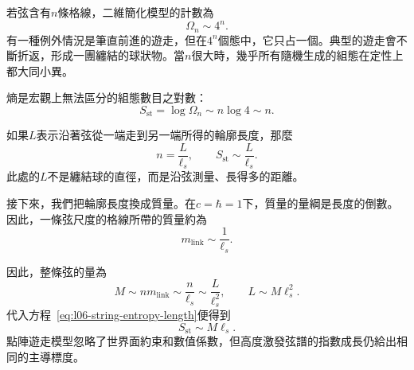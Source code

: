 若弦含有\(n\)條格線，二維簡化模型的計數為
\begin{equation}
\Omega_n\sim4^n.
\label{eq:l06-walk-count}
\end{equation}
有一種例外情況是筆直前進的遊走，但在\(4^n\)個態中，它只占一個。典型的遊走會不斷折返，形成一團纏結的球狀物。當\(n\)很大時，幾乎所有隨機生成的組態在定性上都大同小異。

熵是宏觀上無法區分的組態數目之對數：
\begin{equation}
S_{\mathrm{st}}=\log\Omega_n\sim n\log4\sim n.
\label{eq:l06-string-entropy-n}
\end{equation}

\begin{classroomqa}
\end{classroomqa}

如果\(L\)表示沿著弦從一端走到另一端所得的輪廓長度，那麼
\begin{equation}
n=\frac{L}{\ell_s},
\qquad
S_{\mathrm{st}}\sim\frac{L}{\ell_s}.
\label{eq:l06-string-entropy-length}
\end{equation}
此處的\(L\)不是纏結球的直徑，而是沿弦測量、長得多的距離。

接下來，我們把輪廓長度換成質量。在\(c=\hbar=1\)下，質量的量綱是長度的倒數。因此，一條弦尺度的格線所帶的質量約為
\begin{equation}
m_{\mathrm{link}}\sim\frac{1}{\ell_s}.
\label{eq:l06-link-mass}
\end{equation}

\begin{classroomqa}
\end{classroomqa}

因此，整條弦的量為
\begin{equation}
M\sim n m_{\mathrm{link}}
\sim\frac{n}{\ell_s}
\sim\frac{L}{\ell_s^2},
\qquad
L\sim M\ell_s^2.
\label{eq:l06-string-mass}
\end{equation}
代入方程~\eqref{eq:l06-string-entropy-length}便得到
\begin{equation}
S_{\mathrm{st}}\sim M\ell_s.
\label{eq:l06-string-entropy-mass}
\end{equation}
點陣遊走模型忽略了世界面約束和數值係數，但高度激發弦譜的指數成長仍給出相同的主導標度。

